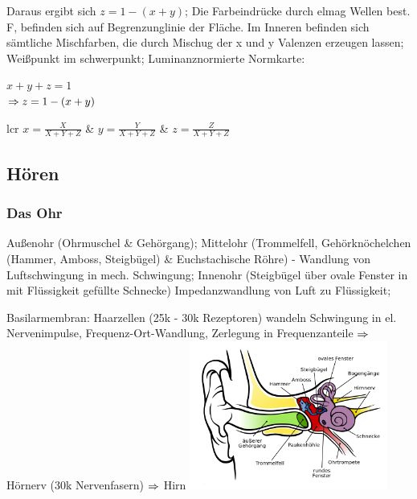 \documentclass[german,color,6pt]{latex4ei/latex4ei_sheet}
\begin{document}
\begin{sectionbox}
Daraus ergibt sich $z = 1 - (x+y)$; Die Farbeindrücke durch elmag Wellen best. F, befinden sich auf Begrenzunglinie der Fläche. Im Inneren befinden sich sämtliche Mischfarben, die durch Mischug der x und y Valenzen erzeugen lassen; Weißpunkt im schwerpunkt; Luminanznormierte Normkarte: 
\vspace{0.3em}

\begin{emphbox}
$x + y + z = 1$\\
$\Rightarrow z = 1 - (x+y)$
\end{emphbox}

\vspace{0.3em}

\begin{tablebox}{lcr}
	$x = \frac{X}{X + Y + Z}$ & $y = \frac{Y}{X + Y + Z}$ & $z = \frac{Z}{X + Y + Z}$\\
\end{tablebox}
\end{sectionbox}


\subsection{Hören}

\begin{sectionbox}
\subsubsection{Das Ohr}
 Außenohr (Ohrmuschel \& Gehörgang); Mittelohr (Trommelfell, Gehörknöchelchen (Hammer, Amboss, Steigbügel) \& Euchstachische Röhre) - Wandlung von Luftschwingung in mech. Schwingung; Innenohr (Steigbügel über ovale Fenster in mit Flüssigkeit gefüllte Schnecke) Impedanzwandlung von Luft zu Flüssigkeit; 

Basilarmembran: Haarzellen (25k - 30k Rezeptoren) wandeln Schwingung in el. Nervenimpulse, Frequenz-Ort-Wandlung, Zerlegung in Frequenzanteile $\Rightarrow$ Hörnerv (30k Nervenfasern) $\Rightarrow$ Hirn
\includegraphics[width=6.5cm]{./img/Ohr.png}
\end{sectionbox}
\end{document}
